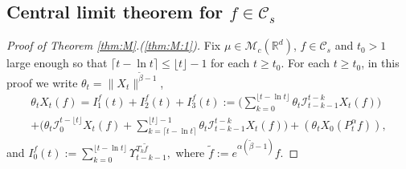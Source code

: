\documentclass[12pt,a4paper]{amsart}
\theoremstyle{plain}
\theoremstyle{definition}
\numberwithin{equation}{section}
\begin{document}
\subsection{Central limit theorem for $f\in \mathcal C_s$}
\label{sec: small rate}

\begin{proof}[Proof of Theorem \ref{thm:M}.(\ref{thm:M:1})]
	Fix $\mu\in \mathcal M_c(\mathbb R^d)$, $f\in \mathcal C_s$
    and $t_0 > 1$  large enough
so that $ \lceil t - \ln t\rceil \leq \lfloor t \rfloor - 1$ for each $t\geq t_0$.
  For each $t\geq t_0$, in this proof we write $\theta_t = \|X_t\|^{\tilde \beta - 1}$,
  \begin{multline}
    \label{eq:PM:CLTS:1}
    \theta_t  X_t(f)
    = I^f_1(t) + I^f_2(t) + I^f_3(t)
    := \Big(\sum_{k=0}^{\lfloor t-\ln t \rfloor} \theta_t \mathcal I_{t-k-1}^{t-k} X_t(f) \Big)\\
    + \Big( \theta_t \mathcal I_0^{t-\lfloor t \rfloor} X_t(f)   + \sum_{k=\lceil t-\ln t \rceil}^{\lfloor t \rfloor-1} \theta_t \mathcal I_{t-k-1}^{t-k} X_t(f) \Big) + (\theta_t X_0(P_t^\alpha f) ),
\end{multline}
and
\(
 I^f_0(t)
 := \sum_{k=0}^{\lfloor t-\ln t \rfloor} \Upsilon_{t-k-1}^{T_k \tilde f},
\)
where $\tilde f:= e^{\alpha(\tilde \beta - 1)} f$.


\end{proof}
\end{document}
